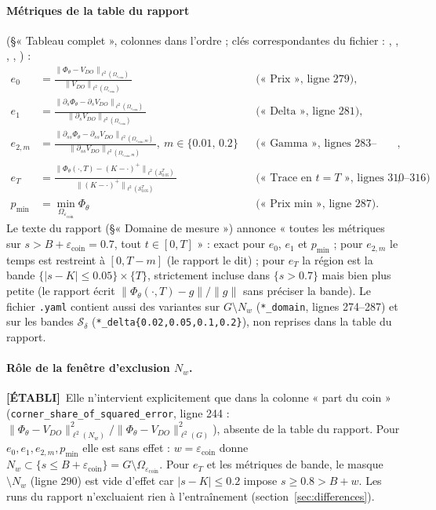 \documentclass[11pt]{article}
\newcommand{\epscoin}{\varepsilon_{\mathrm{coin}}}
\newcommand{\etabli}{\textbf{[ÉTABLI]}}
\newcommand{\VDO}{V_{DO}}
\newcommand{\code}[1]{\texttt{#1}}
\begin{document}
\paragraph{Métriques de la table du rapport} (\S« Tableau complet »,
colonnes dans l'ordre ; clés correspondantes du fichier
 :
, ,
,
, ) :
\begin{align*}
e_0 &= \frac{\|\Phi_\theta-\VDO\|_{\ell^2(\Omega_{\epscoin})}}{\|\VDO\|_{\ell^2(\Omega_{\epscoin})}}
  && \text{(« Prix », ligne 279)},\\
e_1 &= \frac{\|\partial_s\Phi_\theta-\partial_s\VDO\|_{\ell^2(\Omega_{\epscoin})}}{\|\partial_s\VDO\|_{\ell^2(\Omega_{\epscoin})}}
  && \text{(« Delta », ligne 281)},\\
e_{2,m} &= \frac{\|\partial_{ss}\Phi_\theta-\partial_{ss}\VDO\|_{\ell^2(\Omega_{\epscoin,m})}}{\|\partial_{ss}\VDO\|_{\ell^2(\Omega_{\epscoin,m})}},\ m\in\{0.01,\,0.2\}
  && \text{(« Gamma », lignes 283--286)},\\
e_T &= \frac{\|\Phi_\theta(\cdot,T)-(K-\cdot)^+\|_{\ell^2(\mathcal S^T_{0.05})}}{\|(K-\cdot)^+\|_{\ell^2(\mathcal S^T_{0.05})}}
  && \text{(« Trace en $t{=}T$ », lignes 310--316)},\\
p_{\min} &= \min_{\Omega_{\epscoin}}\Phi_\theta
  && \text{(« Prix min », ligne 287)}.
\end{align*}
Le texte du rapport (\S« Domaine de mesure ») annonce « toutes les métriques
sur $s>B+\epscoin=0.7$, tout $t\in[0,T]$ » : exact pour $e_0$, $e_1$ et
$p_{\min}$ ; pour $e_{2,m}$ le temps est restreint à $[0,T-m]$ (le rapport
le dit) ; pour $e_T$ la région est la bande $\{|s-K|\le0.05\}\times\{T\}$,
strictement incluse dans $\{s>0.7\}$ mais bien plus petite (le rapport écrit
$\|\Phi_\theta(\cdot,T)-g\|/\|g\|$ sans préciser la bande). Le fichier
\code{.yaml} contient aussi des variantes sur $G\setminus N_w$
(\code{*\_domain}, lignes 274--287) et sur les bandes
$\mathcal S_\delta$ (\code{*\_delta\{0.02,0.05,0.1,0.2\}}), non reprises dans
la table du rapport.

\paragraph{Rôle de la fenêtre d'exclusion $N_w$.} \etabli\ Elle n'intervient
explicitement que dans la colonne « part du coin »
(\code{corner\_share\_of\_squared\_error}, ligne 244 :
$\|\Phi_\theta-\VDO\|^2_{\ell^2(N_w)}/\|\Phi_\theta-\VDO\|^2_{\ell^2(G)}$),
absente de la table du rapport. Pour $e_0,e_1,e_{2,m},p_{\min}$ elle est sans
effet : $w=\epscoin$ donne $N_w\subset\{s\le B+\epscoin\}=G\setminus\Omega_{\epscoin}$.
Pour $e_T$ et les métriques de bande, le masque $\setminus N_w$ (ligne 290)
est vide d'effet car $|s-K|\le0.2$ impose $s\ge0.8>B+w$. Les runs du rapport
n'excluaient rien à l'entraînement (section~\ref{sec:differences}).
\end{document}
